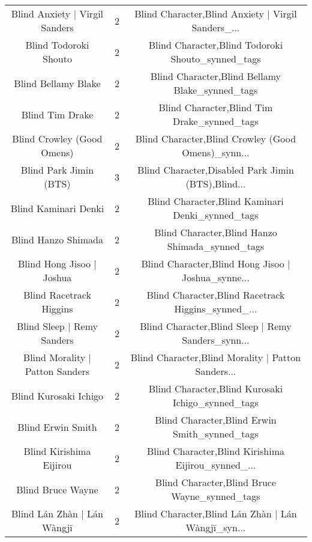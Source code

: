 \begin{table}[h!]
{\begin{tabular}{|c|c|c|}
                    Blind Anxiety | Virgil Sanders &          2 & Blind Character,Blind Anxiety | Virgil Sanders\_... \\
                             Blind Todoroki Shouto &          2 &  Blind Character,Blind Todoroki Shouto\_synned\_tags \\
                               Blind Bellamy Blake &          2 &    Blind Character,Blind Bellamy Blake\_synned\_tags \\
                                   Blind Tim Drake &          2 &        Blind Character,Blind Tim Drake\_synned\_tags \\
                        Blind Crowley (Good Omens) &          2 & Blind Character,Blind Crowley (Good Omens)\_synn... \\
                            Blind Park Jimin (BTS) &          3 & Blind Character,Disabled Park Jimin (BTS),Blind... \\
                              Blind Kaminari Denki &          2 &   Blind Character,Blind Kaminari Denki\_synned\_tags \\
                               Blind Hanzo Shimada &          2 &    Blind Character,Blind Hanzo Shimada\_synned\_tags \\
                         Blind Hong Jisoo | Joshua &          2 & Blind Character,Blind Hong Jisoo | Joshua\_synne... \\
                           Blind Racetrack Higgins &          2 & Blind Character,Blind Racetrack Higgins\_synned\_... \\
                        Blind Sleep | Remy Sanders &          2 & Blind Character,Blind Sleep | Remy Sanders\_synn... \\
                   Blind Morality | Patton Sanders &          2 & Blind Character,Blind Morality | Patton Sanders... \\
                             Blind Kurosaki Ichigo &          2 &  Blind Character,Blind Kurosaki Ichigo\_synned\_tags \\
                                 Blind Erwin Smith &          2 &      Blind Character,Blind Erwin Smith\_synned\_tags \\
                           Blind Kirishima Eijirou &          2 & Blind Character,Blind Kirishima Eijirou\_synned\_... \\
                                 Blind Bruce Wayne &          2 &      Blind Character,Blind Bruce Wayne\_synned\_tags \\
                       Blind Lán Zhàn | Lán Wàngjī &          2 & Blind Character,Blind Lán Zhàn | Lán Wàngjī\_syn... \\

\end{tabular}}
\end{table}
